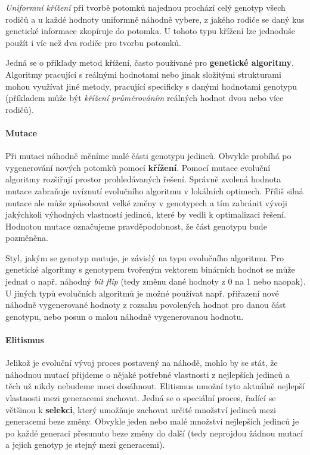 \emph{Uniformní křížení} při tvorbě potomků najednou prochází celý genotyp
všech rodičů a u každé hodnoty uniformně náhodně vybere, z jakého rodiče se
daný kus genetické informace zkopíruje do potomka. U tohoto typu křížení lze
jednoduše použít i víc než dva rodiče pro tvorbu potomků.

Jedná se o příklady metod křížení, často používané pro \textbf{genetické
algoritmy}. Algoritmy pracující s reálnými hodnotami nebo jinak složitými
strukturami mohou využívat jiné metody, pracující specificky s danými hodnotami
genotypu (příkladem může být \emph{křížení průměrováním} reálných hodnot dvou
nebo více rodičů). 

\paragraph{Mutace}
Při mutaci náhodně měníme malé části genotypu jedinců. Obvykle probíhá po
vygenerování nových potomků pomocí \textbf{křížení}. Pomocí mutace evoluční
algoritmy rozšiřují prostor prohledávaných řešení. Správně zvolená hodnota
mutace zabraňuje uvíznutí evolučního algoritmu v lokálních optimech. Příliš
silná mutace ale může způsobovat velké změny v genotypech a tím zabránit
vývoji jakýchkoli výhodných vlastností jedinců, které by vedli k optimalizaci
řešení. Hodnotou mutace označujeme pravděpodobnost, že část genotypu bude
pozměněna.

Styl, jakým se genotyp mutuje, je závislý na typu evolučního algoritmu. Pro
genetické algoritmy s genotypem tvořeným vektorem binárních hodnot se může
jednat o např. náhodný \emph{bit flip} (tedy změnu dané hodnoty z 0 na 1 nebo
naopak). U jiných typů evolučních algoritmů je možné používat např. přiřazení
nové náhodně vygenerované hodnoty z rozsahu povolených hodnot pro danou část
genotypu, nebo posun o malou náhodně vygenerovanou hodnotu.

\paragraph{Elitismus}
Jelikož je evoluční vývoj proces postavený na náhodě, mohlo by se stát, že
náhodnou mutací přijdeme o nějaké potřebné vlastnosti z nejlepších jedinců a
těch už nikdy nebudeme moci dosáhnout. Elitismus umožní tyto aktuálně nejlepší
vlastnosti mezi generacemi zachovat. Jedná se o speciální proces, řadící se
většinou k \textbf{selekci}, který umožňuje zachovat určité množství jedinců
mezi generacemi beze změny. Obvykle jeden nebo malé množství nejlepších jedinců
je po každé generaci přesunuto beze změny do další (tedy neprojdou žádnou
mutací a jejich genotyp je stejný mezi generacemi). 

